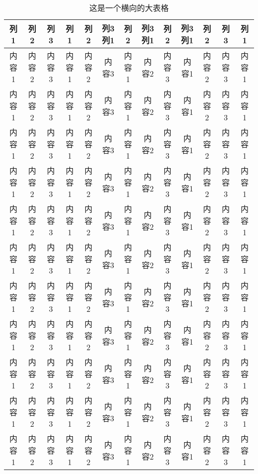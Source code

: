 \begin{table}[H]
	\centering
	\caption{这是一个横向的大表格}
	\begin{sideways}
		\begin{tabular}{c c c c c c c c c c c c c}
			\toprule[1.5pt]  
			列1 & 列2 & 列3 & 列1 & 列2 & 列3 列1 & 列2 & 列3 列1 & 列2 & 列3 列1 & 列2 & 列3 & 列1  \\
			\midrule[1pt]  
			内容1 & 内容2 & 内容3 & 内容1 & 内容2 & 内容3 & 内容1 & 内容2 & 内容3 &内容1 & 内容2 & 内容3 & 内容1  \\
			
			内容1 & 内容2 & 内容3 & 内容1 & 内容2 & 内容3 & 内容1 & 内容2 & 内容3 &内容1 & 内容2 & 内容3 & 内容1  \\
			
			内容1 & 内容2 & 内容3 & 内容1 & 内容2 & 内容3 & 内容1 & 内容2 & 内容3 &内容1 & 内容2 & 内容3 & 内容1 \\
			
			内容1 & 内容2 & 内容3 & 内容1 & 内容2 & 内容3 & 内容1 & 内容2 & 内容3 &内容1 & 内容2 & 内容3 & 内容1 \\
			
			内容1 & 内容2 & 内容3 & 内容1 & 内容2 & 内容3 & 内容1 & 内容2 & 内容3 &内容1 & 内容2 & 内容3 & 内容1  \\
			
			内容1 & 内容2 & 内容3 & 内容1 & 内容2 & 内容3 & 内容1 & 内容2 & 内容3 &内容1 & 内容2 & 内容3 & 内容1  \\
			
			内容1 & 内容2 & 内容3 & 内容1 & 内容2 & 内容3 & 内容1 & 内容2 & 内容3 &内容1 & 内容2 & 内容3 & 内容1  \\
			
			内容1 & 内容2 & 内容3 & 内容1 & 内容2 & 内容3 & 内容1 & 内容2 & 内容3 &内容1 & 内容2 & 内容3 & 内容1  \\
			
			内容1 & 内容2 & 内容3 & 内容1 & 内容2 & 内容3 & 内容1 & 内容2 & 内容3 &内容1 & 内容2 & 内容3 & 内容1  \\
			
			内容1 & 内容2 & 内容3 & 内容1 & 内容2 & 内容3 & 内容1 & 内容2 & 内容3 &内容1 & 内容2 & 内容3 & 内容1  \\
			
			内容1 & 内容2 & 内容3 & 内容1 & 内容2 & 内容3 & 内容1 & 内容2 & 内容3 &内容1 & 内容2 & 内容3 & 内容1  \\
			\toprule[1.5pt] 
		\end{tabular}
	\end{sideways}
	\label{table2}
\end{table}
